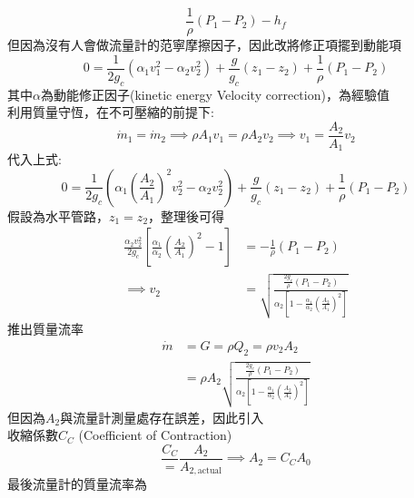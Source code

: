 \documentclass[../main.tex]{subfiles}
\begin{document}
\begin{itemize}
\begin{itemize}
\begin{equation}
      \frac{1}{\rho} (P_1 - P_2) - 
      h_f
    \end{equation}
    但因為沒有人會做流量計的范寧摩擦因子，因此改將修正項擺到動能項
    \begin{equation}
      0 = \frac{1}{2g_c} \boxed{ \left(
       \alpha_1 v_1^2 -\alpha_2 v_2^2
      \right)} + \frac{g}{g_c}(z_1 - z_2) + 
      \frac{1}{\rho} (P_1 - P_2)
    \end{equation}
    其中$\alpha$為動能修正因子(kinetic energy Velocity correction)，為經驗值\\
    利用質量守恆，在不可壓縮的前提下:
    \begin{equation}
      \dot m_1 = \dot m_2 \implies \rho A_1 v_1 = \rho A_2 v_2 \implies v_1 = \frac{A_2}{A_1} v_2
    \end{equation}
    代入上式:
    \begin{equation}
      0 = \frac{1}{2g_c} \left(
       \alpha_1 \left(
        \frac{A_2}{A_1}
       \right)^2 v_2^2 -\alpha_2 v_2^2
      \right) + \frac{g}{g_c}(z_1 - z_2) + 
      \frac{1}{\rho} (P_1 - P_2)
    \end{equation}
    假設為水平管路，$z_1=z_2$，整理後可得
    \begin{align}
      \frac{\alpha_2 v_2^2}{2g_c} \left[
        \frac{\alpha_1}{\alpha_2} \left(
          \frac{A_2}{A_1}\right)^2 - 1
      \right] & =- \frac{1}{\rho} (P_1 - P_2) \nonumber\\
      \implies v_2 & = \boxed{\sqrt{\frac{\frac{2g_c}{\rho}\left(
        P_1 - P_2
      \right)}{\alpha_2 \left[
        1 - \frac{\alpha_1}{\alpha_2} \left(
          \frac{A_2}{A_1}
        \right)^2
      \right]}}}
    \end{align}
    推出質量流率
    \begin{align}
      \dot m &= G = \rho Q_2 = \rho v_2 A_2 \nonumber\\
      &= \boxed{\rho A_2 \sqrt{\frac{\frac{2g_c}{\rho}\left(
        P_1 - P_2
      \right)}{\alpha_2 \left[
        1 - \frac{\alpha_1}{\alpha_2} \left(
          \frac{A_2}{A_1}
        \right)^2
      \right]}}}
    \end{align}
    但因為$A_2$與流量計測量處存在誤差，因此引入\\
    收縮係數$C_C$ (Coefficient of Contraction)
    \begin{equation}
      \frac{C_C} = \frac{A_2}{A_{2,\text{actual}}} \implies A_2 = C_C A_0
    \end{equation}
    最後流量計的質量流率為
    \begin{equation}

\end{equation}
\end{itemize}
\end{itemize}
\end{document}
